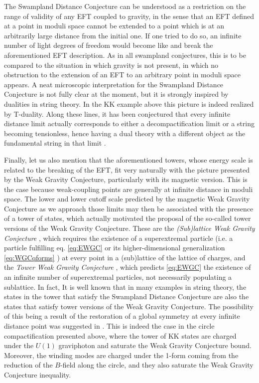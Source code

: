 \documentclass[11pt,a4paper]{article}
\begin{document}
The Swampland Distance Conjecture can be understood as a restriction on the range of validity of any EFT coupled to gravity, in the sense that an EFT defined at a point in moduli space cannot be extended to a point which is at an arbitrarily large distance from the initial one. If one tried to do so, an infinite number of light degrees of freedom would become like and break the aforementioned EFT description. As in all swampland conjectures, this is to be compared to the situation in which gravity is not present, in which no obstruction to the extension of an EFT to an arbitrary point in moduli space appears. A neat microscopic interpretation for the Swampland Distance Conjecture is not fully clear at the moment, but it is strongly inspired by dualities in string theory. In the KK example above this picture is indeed realized by T-duality. Along these lines, it has been conjectured that every infinite distance limit actually corresponds to either a decompactification limit or a string becoming tensionless, hence having a dual theory with a different object as the fundamental string in that limit \cite{Lee:2019xtm, Lee:2019wij}. 

Finally, let us also mention that the aforementioned towers, whose energy scale is related to the breaking of the EFT, fit very naturally with the picture presented by the Weak Gravity Conjecture, particularly with its magnetic version. This is the case because weak-coupling points are generally at infinite distance in moduli space. The lower and lower cutoff scale predicted by the magnetic Weak Gravity Conjecture as we approach those limits may then be associated with the presence of a tower of states, which actually motivated the proposal of the so-called tower versions of the Weak Gravity Conjecture. These are the \emph{(Sub)lattice Weak Gravity Conjecture} \cite{Heidenreich:2015nta,Heidenreich:2016aqi}, which requires the existence of a superextremal particle (i.e. a particle fulfilling eq. \eqref{eq:EWGC} or its higher-dimensional generalization \eqref{eq:WGCqforms} ) at every point in a (sub)lattice of the lattice of charges, and the \emph{Tower Weak Gravity Conjecture} \cite{Andriolo:2018lvp}, which predicts \eqref{eq:EWGC} the existence of an infinite number of superextremal particles, not necessarily populating a sublattice.  In fact, It is well known that in many examples in string theory, the states in the tower that satisfy the Swampland Distance Conjecture are also the states that satisfy tower versions of the Weak Gravity Conjecture. The possibility of this being a result of the restoration of a global symmetry at every infinite distance point was suggested in \cite{Gendler:2020dfp}. This is indeed the case in the circle compactification presented above, where the tower of KK states are charged under the $U(1)$ graviphoton and saturate the Weak Gravity Conjecture bound. Moreover, the winding modes are charged under the 1-form coming from the reduction of the $B$-field along the circle, and they also saturate the Weak Gravity Conjecture inequality.
\end{document}
